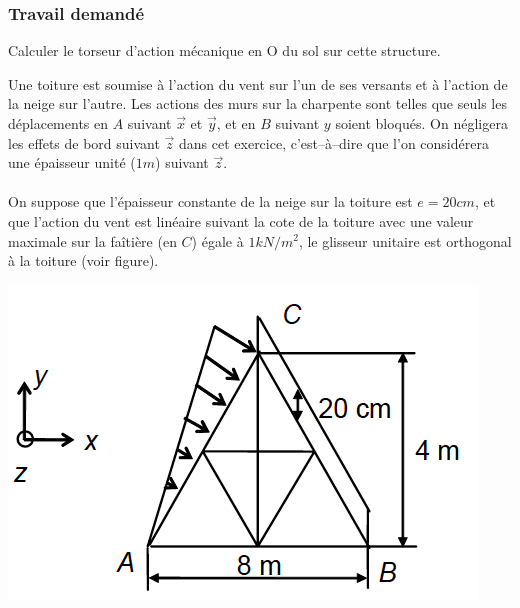 \subsubsection{Travail demandé}
Calculer le torseur d’action mécanique en O du sol sur cette structure.

\newpage



Une toiture est soumise à l’action du vent sur l’un de ses versants et à l’action de la neige sur l’autre. Les actions des murs sur la charpente sont telles que seuls les déplacements en $A$ suivant $\overrightarrow{x}$ et $\overrightarrow{y}$, et en $B$ suivant $y$ soient bloqués. On négligera les effets de bord suivant $\overrightarrow{z}$ dans cet exercice, c’est–à–dire que l’on considérera une épaisseur unité ($1 m$) suivant $\overrightarrow{z}$.\\\\
On suppose que l’épaisseur constante de la neige sur la toiture est $e = 20 cm$, et que l’action du vent est linéaire suivant la cote de la toiture avec une valeur maximale sur la faîtière (en $C$) égale à $1 kN/m^2$, le glisseur unitaire est orthogonal à la toiture (voir figure).

\begin{center}
\includegraphics[scale=0.5]{png/toiture.png}
\end{center}

